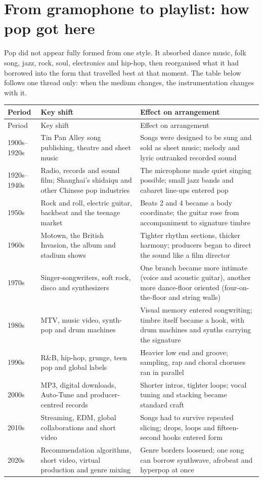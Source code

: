 \section{From gramophone to playlist: how pop got here}
\label{sec:pop-history}

Pop did not appear fully formed from one style. It absorbed dance music, folk song, jazz, rock, soul, electronics and hip-hop, then reorganised what it had borrowed into the form that travelled best at that moment. The table below follows one thread only: when the medium changes, the instrumentation changes with it.

\begin{longtable}{p{}p{}p{}}
\toprule
Period & Key shift & Effect on arrangement \\
\midrule
\endfirsthead
\toprule
Period & Key shift & Effect on arrangement \\
\midrule
\endhead
1900s--1920s & Tin Pan Alley song publishing, theatre and sheet music & Songs were designed to be sung and sold as sheet music; melody and lyric outranked recorded sound \\
1920s--1940s & Radio, records and sound film; Shanghai's shidaiqu and other Chinese pop industries & The microphone made quiet singing possible; small jazz bands and cabaret line-ups entered pop \\
1950s & Rock and roll, electric guitar, backbeat and the teenage market & Beats 2 and 4 became a body coordinate; the guitar rose from accompaniment to signature timbre \\
1960s & Motown, the British Invasion, the album and stadium shows & Tighter rhythm sections, thicker harmony; producers began to direct the sound like a film director \\
1970s & Singer-songwriters, soft rock, disco and synthesizers & One branch became more intimate (voice and acoustic guitar), another more dance-floor oriented (four-on-the-floor and string walls) \\
1980s & MTV, music video, synth-pop and drum machines & Visual memory entered songwriting; timbre itself became a hook, with drum machines and synths carrying the signature \\
1990s & R\&B, hip-hop, grunge, teen pop and global labels & Heavier low end and groove; sampling, rap and choral choruses ran in parallel \\
2000s & MP3, digital downloads, Auto-Tune and producer-centred records & Shorter intros, tighter loops; vocal tuning and stacking became standard craft \\
2010s & Streaming, EDM, global collaborations and short video & Songs had to survive repeated slicing; drops, loops and fifteen-second hooks entered form \\
2020s & Recommendation algorithms, short video, virtual production and genre mixing & Genre borders loosened; one song can borrow synthwave, afrobeat and hyperpop at once \\
\bottomrule
\end{longtable}

